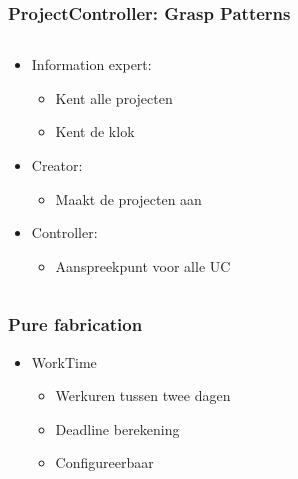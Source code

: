 \documentclass{beamer}
\begin{document}
\begin{frame}
\frametitle {ProjectController: Grasp Patterns}
\begin{columns}
    \begin{column}{.45\paperwidth}
    \begin{itemize}
        \item Information expert:
            \begin{itemize}
                \item Kent alle projecten
                \item Kent de klok
            \end{itemize}
        \item Creator:
            \begin{itemize}
                \item Maakt de projecten aan
            \end{itemize}
        \item Controller:
            \begin{itemize}
                \item Aanspreekpunt voor alle UC
            \end{itemize}
    \end{itemize}
    \end{column}
\end{columns}
\end{frame}



%

\begin{frame}
\frametitle{Pure fabrication}
\begin{itemize}
\item WorkTime
\begin{itemize}
\item Werkuren tussen twee dagen 
\item Deadline berekening
\item Configureerbaar
\end{itemize}
\end{itemize}
\end{frame}

%
\end{document}
